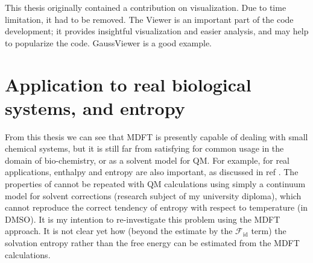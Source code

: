 This thesis originally contained a contribution on visualization.
Due to time limitation, it had to be removed. The Viewer is an important
part of the code development; it provides insightful visualization
and easier analysis, and may help to popularize the code. GaussViewer
is a good example.

\section{Application to real biological systems, and entropy}

From this thesis we can see that \acs{MDFT} is presently capable
of dealing with small chemical systems, but it is still far from satisfying
for common usage in the domain of bio-chemistry, or as a solvent model
for \acs{QM}. For example, for real applications, enthalpy and entropy
are also important, as discussed in ref \citep{Mn-oxo}. The properties
of \citep{Mn-oxo} cannot be repeated with \acs{QM} calculations
using simply a continuum model for solvent corrections (research subject
of my university diploma), which cannot reproduce the correct tendency
of entropy with respect to temperature (in DMSO). It is my intention
to re-investigate this problem using the \acs{MDFT} approach. It
is not clear yet how (beyond the estimate by the $\mathcal{F}_{\mathrm{id}}$
term) the solvation entropy rather than the free energy can be estimated
from the \acs{MDFT} calculations.
